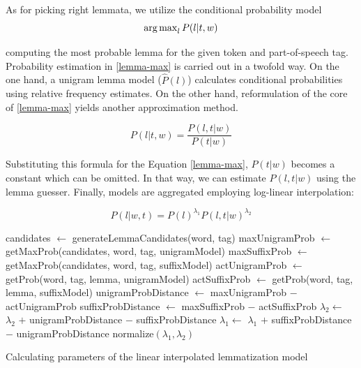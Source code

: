 As for picking right lemmata, we utilize the conditional probability model
\begin{equation}\label{lemma-max}
\operatorname{arg\,max}_l P(l|t,w)
\end{equation}

computing the most probable lemma for the given token and part-of-speech tag. 
Probability estimation in \eqref{lemma-max} is carried out in a twofold way. On the one hand, a unigram lemma model ($\hat{P}(l)$) calculates conditional probabilities using relative frequency estimates. On the other hand, reformulation of the core of \eqref{lemma-max} yields another approximation method.


\begin{equation}\label{lemma-guesser}
P(l|t,w) = \frac{P(l,t|w)}{P(t|w)}
\end{equation}

Substituting this formula for the Equation \ref{lemma-max}, $P(t|w)$ becomes a constant which can be omitted. 
In that way, we can estimate $P(l,t|w)$ using the lemma guesser. Finally, models are aggregated employing log-linear interpolation: 

\begin{equation}\label{lemma-interpolated}
P(l|w,t) = P(l)^{\lambda_1} P(l,t|w)^{\lambda_2}
\end{equation}

\begin{algorithm*}[h]
\begin{algorithmic}[1]
        \State candidates $\gets$ generateLemmaCandidates(word, tag)
        \State maxUnigramProb $\gets$ getMaxProb(candidates, word, tag, unigramModel)
        \State maxSuffixProb $\gets$ getMaxProb(candidates, word, tag, suffixModel)
        \State actUnigramProb $\gets$ getProb(word, tag, lemma, unigramModel)
        \State actSuffixProb $\gets$ getProb(word, tag, lemma, suffixModel)
        \State unigramProbDistance $\gets$ maxUnigramProb $-$ actUnigramProb
        \State suffixProbDistance $\gets$ maxSuffixProb $-$ actSuffixProb
            \State $\lambda_{2} \gets$ $\lambda_{2}$ $+$ unigramProbDistance $-$ suffixProbDistance
        \Else%
            \State $\lambda_{1} \gets$ $\lambda_{1}$ $+$ suffixProbDistance $-$ unigramProbDistance
        \EndIf
    \EndFor
    \State normalize$( \lambda_{1}, \lambda_{2} )$
  \end{algorithmic}
  \caption{Calculating parameters of the linear interpolated lemmatization model}
\label{lemma-interpolation-algorithm}
\end{algorithm*}

